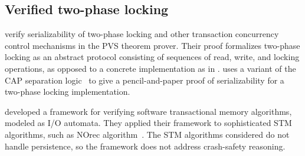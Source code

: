 
%


\subsection{Verified two-phase locking}

\citet{ChkliaevHS99} verify serializability of two-phase locking and other
transaction concurrency control mechanisms in the PVS theorem prover. Their
proof formalizes two-phase locking as an abstract protocol consisting of
sequences of read, write, and locking operations, as opposed to a concrete
implementation as in \sys. \citet{pollak-2PL} uses a variant of the
CAP separation logic~\citep{dinsdale:cap} to give a pencil-and-paper
proof of serializability for a two-phase locking implementation.

\citet{mohsen:stm} developed a framework for verifying software transactional memory algorithms, modeled
as I/O automata. They applied their framework to sophisticated STM algorithms, such as
NOrec algorithm~\cite{dalessandro:norec}. The STM algorithms considered do not
handle persistence, so the framework does not address crash-safety reasoning.

